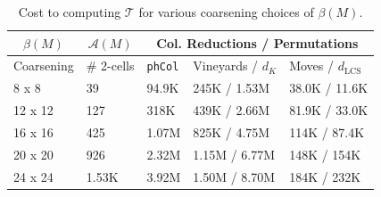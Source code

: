 \documentclass[sn-mathphys]{sn-jnl}
\begin{document}
\begin{table}[h]
\caption{Cost to computing $\mathcal{T}$ for various coarsening choices of $\beta(M)$.}\label{tab:barcode_templates}
\centering
\begin{tabular}{ m{1.6cm} m{1.6cm} m{1.2cm} m{2.8cm} m{2.4cm} }
 \hline
  \multicolumn{1}{|c|}{ $\beta(M)$ } & \multicolumn{1}{|c|}{$\mathcal{A}(M)$ } & \multicolumn{3}{c|}{ Col. Reductions / Permutations } \\
 \hline
\small{Coarsening} & \# 2-cells & \texttt{phCol} & Vineyards / $d_{K}$ & Moves / $d_{\text{LCS}}$ \\
 \hline
 8 x 8 & 39 & 94.9K & 245K / 1.53M & 38.0K / 11.6K   \\
 \hline
 12 x 12 & 127 & 318K & 439K / 2.66M & 81.9K / 33.0K \\
 \hline 
 16 x 16 & 425 & 1.07M & 825K / 4.75M & 114K / 87.4K \\
 \hline 
  20 x 20 & 926 & 2.32M & 1.15M / 6.77M  & 148K / 154K\\
 \hline 
  24 x 24 & 1.53K & 3.92M & 1.50M / 8.70M & 184K / 232K  \\
   \hline
 \end{tabular}
\label{table:dual_graph_costs}
\end{table}  
\end{document}
